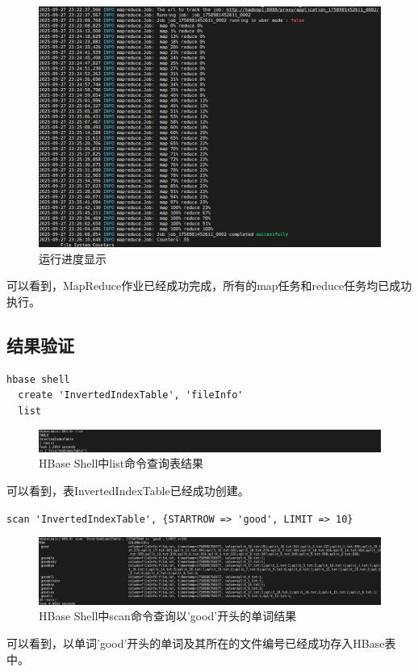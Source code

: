 \documentclass[]{bitreport}
\begin{document}
\begin{figure}[H]
  \centering
  \includegraphics[width=0.9\linewidth]{figures/success.jpg}
  \caption{运行进度显示}
  \label{fig:mapreduce_result}
\end{figure}
可以看到，MapReduce作业已经成功完成，所有的map任务和reduce任务均已成功执行。

\subsection{结果验证}

\begin{lstlisting}[style=shell]
  hbase shell
  create 'InvertedIndexTable', 'fileInfo'
  list
\end{lstlisting}

\begin{figure}[H]
  \centering
  \includegraphics[width=0.9\linewidth]{figures/hbase_list.jpg}
  \caption{HBase Shell中list命令查询表结果}
  \label{fig:hbase_scan}
\end{figure}

可以看到，表InvertedIndexTable已经成功创建。

\lstinline[style=shell]|scan 'InvertedIndexTable', {STARTROW => 'good', LIMIT => 10}|
\begin{figure}[H]
  \centering
  \includegraphics[width=0.9\linewidth]{figures/hbase_scan.jpg}
  \caption{HBase Shell中scan命令查询以'good'开头的单词结果}
  \label{fig:hbase_scan}
\end{figure}
可以看到，以单词'good'开头的单词及其所在的文件编号已经成功存入HBase表中。
\end{document}
